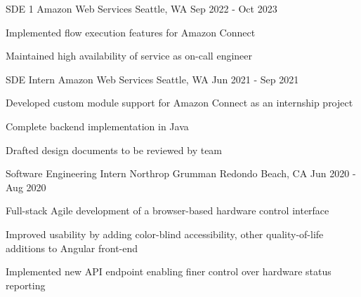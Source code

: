 
\begin{cventries}
	\cventry
	{SDE 1}
	{Amazon Web Services}
	{Seattle, WA}
	{Sep 2022 - Oct 2023}
	{
		\begin{cvitems}
			\item{Implemented flow execution features for Amazon Connect}
			\item{Maintained high availability of service as on-call engineer}
		\end{cvitems}
	}
	\cventry
	{SDE Intern}
	{Amazon Web Services}
	{Seattle, WA}
	{Jun 2021 - Sep 2021}
	{
		\begin{cvitems}
			\item{Developed custom module support for Amazon Connect as an internship project}
			\item{Complete backend implementation in Java}
			\item{Drafted design documents to be reviewed by team}
		\end{cvitems}
	}
	\cventry
	{Software Engineering Intern}
	{Northrop Grumman}
	{Redondo Beach, CA}
	{Jun 2020 - Aug 2020}
	{
		\begin{cvitems}
			\item{Full-stack Agile development of a browser-based hardware control interface}
			\item{Improved usability by adding color-blind accessibility, other quality-of-life additions to Angular front-end}
			\item{Implemented new API endpoint enabling finer control over hardware status reporting}
		\end{cvitems}
	}
\end{cventries}
